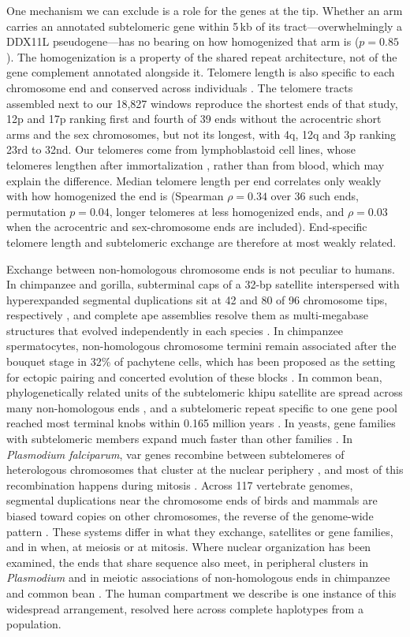 \documentclass[pdflatex,mathphys]{jnl}
\begin{document}
One mechanism we can exclude is a role for the genes at the tip. Whether an arm carries an annotated
subtelomeric gene within 5\,kb of its tract---overwhelmingly a DDX11L pseudogene---has no bearing on
how homogenized that arm is ($p = 0.85$). The homogenization is a property of the shared repeat
architecture, not of the gene complement annotated alongside it.
Telomere length is also specific to each chromosome end and conserved across individuals
\cite{Karimian2024}. The telomere tracts assembled next to our 18,827 windows reproduce the shortest
ends of that study, 12p and 17p ranking first and fourth of 39 ends without the acrocentric short
arms and the sex chromosomes, but not its longest, with 4q, 12q and 3p ranking 23rd to 32nd. Our
telomeres come from lymphoblastoid cell lines, whose telomeres lengthen after immortalization
\cite{Lucas2026}, rather than from blood, which may explain the difference. Median
telomere length per end correlates only weakly with how homogenized the end is (Spearman
$\rho = 0.34$ over 36 such ends, permutation $p = 0.04$, longer telomeres at less homogenized ends,
and $\rho = 0.03$ when the acrocentric and sex-chromosome ends are included). End-specific telomere
length and subtelomeric exchange are therefore at most weakly related.

Exchange between non-homologous chromosome ends is not peculiar to humans. In chimpanzee and gorilla,
subterminal caps of a 32-bp satellite interspersed with hyperexpanded segmental duplications sit at 42
and 80 of 96 chromosome tips, respectively \cite{Ventura2012}, and complete ape assemblies resolve them
as multi-megabase structures that evolved independently in each species \cite{Yoo2025}. In chimpanzee
spermatocytes, non-homologous chromosome termini remain associated after the bouquet stage in 32\% of
pachytene cells, which has been proposed as the setting for ectopic pairing and concerted evolution of
these blocks \cite{Hirai2019}. In common bean, phylogenetically related units of the subtelomeric khipu
satellite are spread across many non-homologous ends \cite{Richard2013}, and a subtelomeric repeat
specific to one gene pool reached most terminal knobs within 0.165 million years \cite{Chen2018}. In
yeasts, gene families with subtelomeric members expand much faster than other families \cite{Brown2010}.
In \emph{Plasmodium falciparum}, var genes recombine between subtelomeres of heterologous chromosomes
that cluster at the nuclear periphery \cite{FreitasJunior2000}, and most of this recombination happens
during mitosis \cite{Claessens2014}. Across 117 vertebrate genomes, segmental duplications near the
chromosome ends of birds and mammals are biased toward copies on other chromosomes, the reverse of the
genome-wide pattern \cite{Aqil2026}. These systems differ in what they exchange, satellites or gene
families, and in when, at meiosis or at mitosis. Where nuclear organization has been examined, the ends
that share sequence also meet, in peripheral clusters in \emph{Plasmodium} and in meiotic associations of
non-homologous ends in chimpanzee and common bean \cite{FreitasJunior2000,Hirai2019,Richard2013}. The human
compartment we describe is one instance of this widespread arrangement, resolved here across complete
haplotypes from a population.
\end{document}
